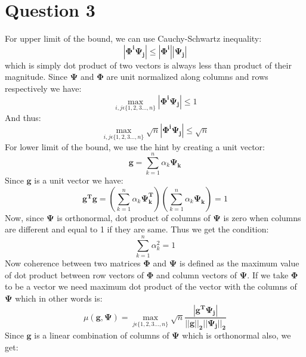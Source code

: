 \documentclass[12pt]{article}
\begin{document}
\section*{Question 3}
For upper limit of the bound, we can use Cauchy-Schwartz inequality:
\begin{equation*}
    |\boldsymbol{\Phi^i\Psi_j}| \leq |\boldsymbol{\Phi^i}||\boldsymbol{\Psi_j}|
\end{equation*}
which is simply dot product of two vectors is always less than product of their magnitude. Since $\boldsymbol{\Psi}$ and $\boldsymbol{\Phi}$ are unit normalized along columns and rows respectively we have:
\begin{equation*}
   \max_{i,j \epsilon \{1,2,3...,n\}}|\boldsymbol{\Phi^i\Psi_j}| \leq 1
\end{equation*}
And thus:
\begin{equation*}
   \max_{i,j \epsilon \{1,2,3...,n\}}\sqrt{n}|\boldsymbol{\Phi^i\Psi_j}| \leq \sqrt{n}
\end{equation*}
For lower limit of the bound, we use the hint by creating a unit vector:
\begin{equation*}
    \boldsymbol{g} = \sum_{k=1}^{n}\alpha_k\boldsymbol{\Psi_k}
\end{equation*}
Since $\boldsymbol{g}$ is a unit vector we have:
\begin{equation*}
    \boldsymbol{g^T}\boldsymbol{g} = (\sum_{k=1}^{n}\alpha_k\boldsymbol{\Psi_k^T})(\sum_{k=1}^{n}\alpha_k\boldsymbol{\Psi_k}) = 1
\end{equation*}
Now, since $\boldsymbol{\Psi}$ is orthonormal, dot product of columns of $\boldsymbol{\Psi}$ is zero when columns are different and equal to 1 if they are same. Thus we get the condition:
\begin{equation*}
     \sum_{k=1}^{n}\alpha_k^2 = 1
\end{equation*}
Now coherence between two matrices $\boldsymbol{\Phi}$ and $\boldsymbol{\Psi}$ is defined as the maximum value of dot product between row vectors of $\boldsymbol{\Phi}$ and column vectors of $\boldsymbol{\Psi}$. If we take $\boldsymbol{\Phi}$ to be a vector we need maximum dot product of the vector with the columns of $\boldsymbol{\Psi}$ which in other words is:
\begin{equation*}
    \mu(\boldsymbol{g}, \boldsymbol{\Psi}) = \max_{j \epsilon \{1,2,3...,n\}}\sqrt{n}\frac{|\boldsymbol{g^T\Psi_j}|}{\boldsymbol{||g||_2||\Psi_j||_2}}
\end{equation*}
Since $\boldsymbol{g}$ is a linear combination of columns of $\boldsymbol{\Psi}$ which is orthonormal also, we get:
\end{document}
